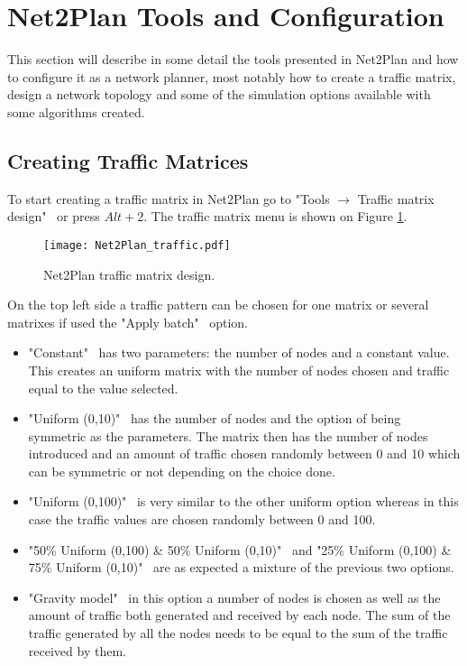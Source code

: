\newpage
\section*{Net2Plan Tools and Configuration}
This section will describe in some detail the tools presented in Net2Plan and how to configure it as a network planner, most notably how to create a traffic matrix, design a network topology and some of the simulation options available with some algorithms created.

	\subsection*{Creating Traffic Matrices}
    To start creating a traffic matrix in Net2Plan go to "Tools $\rightarrow$ Traffic matrix design" \ or press $Alt+2$. The traffic matrix menu is shown on Figure \ref{Net2Plan_traffic}.
	
	\begin{figure}[H]
		\vspace{-0.3cm}
		\centering	
		\texttt{[image: Net2Plan\_traffic.pdf]}
		\caption{Net2Plan traffic matrix design.}
		\label{Net2Plan_traffic}
	\end{figure}
		
	On the top left side a traffic pattern can be chosen for one matrix or several matrixes if used the "Apply batch" \ option.
	
	\begin{itemize}	
		
		\item{"Constant" \ has two parameters: the number of nodes and a constant value. This creates an uniform matrix with the number of nodes chosen and traffic equal to the value selected.}
	
		\item{"Uniform (0,10)" \, has the number of nodes and the option of being symmetric as the parameters. The matrix then has the number of nodes introduced and an amount of traffic chosen randomly between 0 and 10 which can be symmetric or not depending on the choice done.}
	
		\item{"Uniform (0,100)" \, is very similar to the other uniform option whereas in this case the traffic values are chosen randomly between 0 and 100.}
	
		\item{"50\% Uniform (0,100) \& 50\% Uniform (0,10)" \, and "25\% Uniform (0,100) \& 75\% Uniform (0,10)" \, are as expected a mixture of the previous two options.}
	
		\item{"Gravity model" \, in this option a number of nodes is chosen as well as the amount of traffic both generated and received by each node. The sum of the traffic generated by all the nodes needs to be equal to the sum of the traffic received by them. }

	\end{itemize}
	
